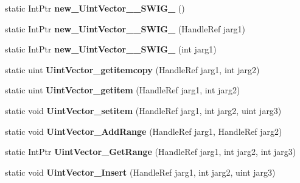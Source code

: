 \begin{DoxyCompactItemize}
\item 
\hypertarget{class_assimp_p_i_n_v_o_k_e_a15538cec602b522f9da7ab9fe9795761}{static Int\+Ptr {\bfseries new\+\_\+\+Uint\+Vector\+\_\+\+\_\+\+S\+W\+I\+G\+\_} ()}\label{class_assimp_p_i_n_v_o_k_e_a15538cec602b522f9da7ab9fe9795761}

\item 
\hypertarget{class_assimp_p_i_n_v_o_k_e_a3a94385c41821ba593f0324f574ac0bf}{static Int\+Ptr {\bfseries new\+\_\+\+Uint\+Vector\+\_\+\+\_\+\+S\+W\+I\+G\+\_} (Handle\+Ref jarg1)}\label{class_assimp_p_i_n_v_o_k_e_a3a94385c41821ba593f0324f574ac0bf}

\item 
\hypertarget{class_assimp_p_i_n_v_o_k_e_a9a887e41f25530ea4ad4ce711848a78d}{static Int\+Ptr {\bfseries new\+\_\+\+Uint\+Vector\+\_\+\+\_\+\+S\+W\+I\+G\+\_} (int jarg1)}\label{class_assimp_p_i_n_v_o_k_e_a9a887e41f25530ea4ad4ce711848a78d}

\item 
\hypertarget{class_assimp_p_i_n_v_o_k_e_a2bdcc283c2052051f196de441af5c70b}{static uint {\bfseries Uint\+Vector\+\_\+getitemcopy} (Handle\+Ref jarg1, int jarg2)}\label{class_assimp_p_i_n_v_o_k_e_a2bdcc283c2052051f196de441af5c70b}

\item 
\hypertarget{class_assimp_p_i_n_v_o_k_e_a47ecffbfd53365a136c67aec8ed1b7f4}{static uint {\bfseries Uint\+Vector\+\_\+getitem} (Handle\+Ref jarg1, int jarg2)}\label{class_assimp_p_i_n_v_o_k_e_a47ecffbfd53365a136c67aec8ed1b7f4}

\item 
\hypertarget{class_assimp_p_i_n_v_o_k_e_a19b0f254875a9708804bcd8c07956eec}{static void {\bfseries Uint\+Vector\+\_\+setitem} (Handle\+Ref jarg1, int jarg2, uint jarg3)}\label{class_assimp_p_i_n_v_o_k_e_a19b0f254875a9708804bcd8c07956eec}

\item 
\hypertarget{class_assimp_p_i_n_v_o_k_e_a4ef83ed4bf39be58d2f71b1bb164493d}{static void {\bfseries Uint\+Vector\+\_\+\+Add\+Range} (Handle\+Ref jarg1, Handle\+Ref jarg2)}\label{class_assimp_p_i_n_v_o_k_e_a4ef83ed4bf39be58d2f71b1bb164493d}

\item 
\hypertarget{class_assimp_p_i_n_v_o_k_e_a94898a9d04970a208ebe53557e7716fc}{static Int\+Ptr {\bfseries Uint\+Vector\+\_\+\+Get\+Range} (Handle\+Ref jarg1, int jarg2, int jarg3)}\label{class_assimp_p_i_n_v_o_k_e_a94898a9d04970a208ebe53557e7716fc}

\item 
\hypertarget{class_assimp_p_i_n_v_o_k_e_a710c24e4b3ced4925e7d0ed147b0edc7}{static void {\bfseries Uint\+Vector\+\_\+\+Insert} (Handle\+Ref jarg1, int jarg2, uint jarg3)}\label{class_assimp_p_i_n_v_o_k_e_a710c24e4b3ced4925e7d0ed147b0edc7}


\end{DoxyCompactItemize}

